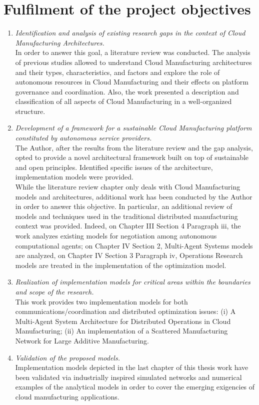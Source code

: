\section{Fulfilment of the project objectives}
\begin{enumerate}
    \item \textit{Identification and analysis of existing research gaps in the context of Cloud Manufacturing Architectures.}\\In order to answer this goal, a literature review was conducted. The analysis of previous studies allowed to understand Cloud Manufacturing architectures and their types, characteristics, and factors and explore the role of autonomous resources in Cloud Manufacturing and their effects on platform governance and coordination. Also, the work presented a description and classification of all aspects of Cloud Manufacturing in a well-organized structure.
    \item \textit{Development of a framework for a sustainable Cloud Manufacturing platform constituted by autonomous service providers.}\\The Author, after the results from the literature review and the gap analysis, opted to provide a novel architectural framework built on top of sustainable and open principles. Identified specific issues of the architecture, implementation models were provided.\\While the literature review chapter only deals with Cloud Manufacturing models and architectures, additional work has been conducted by the Author in order to answer this objective. In particular, an additional review of models and techniques used in the traditional distributed manufacturing context was provided. Indeed, on Chapter III Section 4 Paragraph iii, the work analyzes existing models for negotiation among autonomous computational agents; on Chapter IV Section 2, Multi-Agent Systems models are analyzed, on Chapter IV Section 3 Paragraph iv, Operations Research models are treated in the implementation of the optimization model.
    \item \textit{Realization of implementation models for critical areas within the boundaries and scope of the research.}\\This work provides two implementation models for both communications/coordination and distributed optimization issues: (i) A Multi-Agent System Architecture for Distributed Operations in Cloud Manufacturing; (ii) An implementation of a Scattered Manufacturing Network for Large Additive Manufacturing.
    \item \textit{Validation of the proposed models.}\\Implementation models depicted in the last chapter of this thesis work have been validated via industrially inspired simulated networks and numerical examples of the analytical models in order to cover the emerging exigencies of cloud manufacturing applications.
\end{enumerate}
